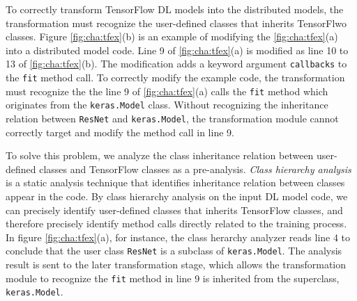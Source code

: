 To correctly transform TensorFlow DL models into the distributed models,
the transformation must recognize the user-defined classes that inherits
TensorFlwo classes.
Figure \ref{fig:cha:tfex}(b) is an example of modifying the \ref{fig:cha:tfex}(a)
into a distributed model code.
Line 9 of \ref{fig:cha:tfex}(a) is modified as line 10 to 13 of 
\ref{fig:cha:tfex}(b). The modification adds a keyword argument {\tt callbacks}
to the {\tt fit} method call. 
To correctly modify the example code, the transformation must recognize the 
the line 9 of \ref{fig:cha:tfex}(a) calls the {\tt fit} method which originates
from the {\tt keras.Model} class.
Without recognizing the inheritance relation between {\tt ResNet} and
{\tt keras.Model}, the transformation module cannot correctly target and modify the
method call in line 9.  

To solve this problem, we analyze the class inheritance relation between
user-defined classes and TensorFlow classes as a pre-analysis.
\textit{Class hierarchy analysis} is a static analysis technique that identifies
inheritance relation between classes appear in the code.
By class hierarchy analysis on the input DL model code,
we can precisely identify user-defined classes that inherits TensorFlow classes,
and therefore precisely identify method calls directly related to the training process.
In figure \ref{fig:cha:tfex}(a), for instance, 
the class herarchy analyzer reads line 4 to conclude that the user class
{\tt ResNet} is a subclass of {\tt keras.Model}.
The analysis result is sent to the later transformation stage,
which allows the transformation module to recognize the {\tt fit} method
in line 9 is inherited from the superclass, {\tt keras.Model}.
